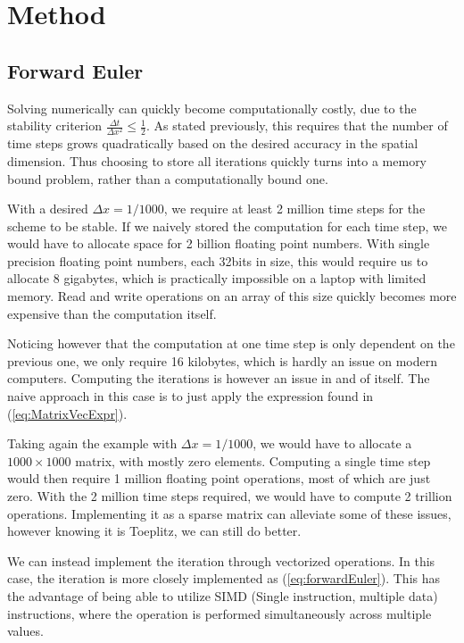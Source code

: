 \documentclass{article}
\theoremstyle{definition}
\begin{document}
\newpage
\section{Method}
\subsection{Forward Euler}
Solving numerically can quickly become computationally costly, due to the stability criterion $\frac{\Delta t}{\Delta x^2} \leq \frac{1}{2}$. As stated previously, this requires that the number of time steps grows quadratically based on the desired accuracy in the spatial dimension. Thus choosing to store all iterations quickly turns into a memory bound problem, rather than a computationally bound one.

With a desired $\Delta x = 1 / 1000$, we require at least 2 million time steps for the scheme to be stable. If we naively stored the computation for each time step, we would have to allocate space for 2 billion floating point numbers. With single precision floating point numbers, each 32bits in size, this would require us to allocate 8 gigabytes, which is practically impossible on a laptop with limited memory. Read and write operations on an array of this size quickly becomes more expensive than the computation itself.

Noticing however that the computation at one time step is only dependent on the previous one, we only require 16 kilobytes, which is hardly an issue on modern computers. Computing the iterations is however an issue in and of itself. The naive approach in this case is to just apply the expression found in (\ref{eq:MatrixVecExpr}).

Taking again the example with $\Delta x = 1 / 1000$, we would have to allocate a $1000 \times 1000$ matrix, with mostly zero elements. Computing a single time step would then require 1 million floating point operations, most of which are just zero. With the 2 million time steps required, we would have to compute 2 trillion operations. Implementing it as a sparse matrix can alleviate some of these issues, however knowing it is Toeplitz, we can still do better.

We can instead implement the iteration through vectorized operations. In this case, the iteration is more closely implemented as (\ref{eq:forwardEuler}). This has the advantage of being able to utilize SIMD (Single instruction, multiple data) instructions, where the operation is performed simultaneously across multiple values.
\end{document}
